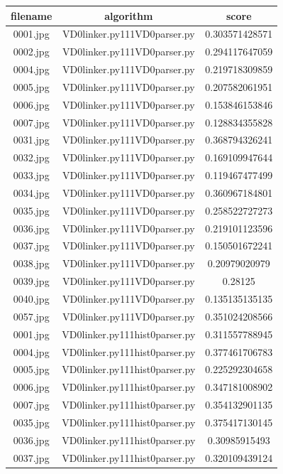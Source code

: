 \documentclass[a4paper,10pt]{article}
\begin{document}
				\begin{table}[htbp]
				\centering
				\begin{tabular}{|c|c|c|}
				\hline
				filename&algorithm&score\\
				\hline
				0001.jpg&VD0linker.py111VD0parser.py&0.303571428571\\
0002.jpg&VD0linker.py111VD0parser.py&0.294117647059\\
0004.jpg&VD0linker.py111VD0parser.py&0.219718309859\\
0005.jpg&VD0linker.py111VD0parser.py&0.207582061951\\
0006.jpg&VD0linker.py111VD0parser.py&0.153846153846\\
0007.jpg&VD0linker.py111VD0parser.py&0.128834355828\\
0031.jpg&VD0linker.py111VD0parser.py&0.368794326241\\
0032.jpg&VD0linker.py111VD0parser.py&0.169109947644\\
0033.jpg&VD0linker.py111VD0parser.py&0.119467477499\\
0034.jpg&VD0linker.py111VD0parser.py&0.360967184801\\
0035.jpg&VD0linker.py111VD0parser.py&0.258522727273\\
0036.jpg&VD0linker.py111VD0parser.py&0.219101123596\\
0037.jpg&VD0linker.py111VD0parser.py&0.150501672241\\
0038.jpg&VD0linker.py111VD0parser.py&0.20979020979\\
0039.jpg&VD0linker.py111VD0parser.py&0.28125\\
0040.jpg&VD0linker.py111VD0parser.py&0.135135135135\\
0057.jpg&VD0linker.py111VD0parser.py&0.351024208566\\
0001.jpg&VD0linker.py111hist0parser.py&0.311557788945\\
0004.jpg&VD0linker.py111hist0parser.py&0.377461706783\\
0005.jpg&VD0linker.py111hist0parser.py&0.225292304658\\
0006.jpg&VD0linker.py111hist0parser.py&0.347181008902\\
0007.jpg&VD0linker.py111hist0parser.py&0.354132901135\\
0035.jpg&VD0linker.py111hist0parser.py&0.375417130145\\
0036.jpg&VD0linker.py111hist0parser.py&0.30985915493\\
0037.jpg&VD0linker.py111hist0parser.py&0.320109439124\\

\end{tabular}
\end{table}
\end{document}
